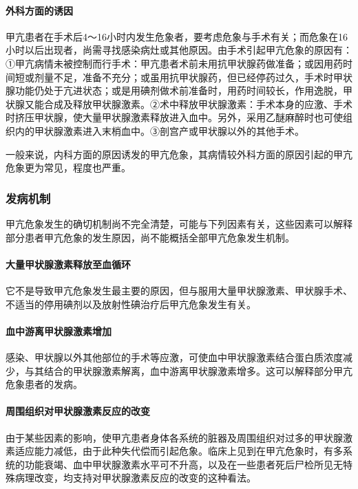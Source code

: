 \paragraph{外科方面的诱因}

甲亢患者在手术后4～16小时内发生危象者，要考虑危象与手术有关；而危象在16小时以后出现者，尚需寻找感染病灶或其他原因。由手术引起甲亢危象的原因有：①甲亢病情未被控制而行手术：甲亢患者术前未用抗甲状腺药做准备；或因用药时间短或剂量不足，准备不充分；或虽用抗甲状腺药，但已经停药过久，手术时甲状腺功能仍处于亢进状态；或是用碘剂做术前准备时，用药时间较长，作用逸脱，甲状腺又能合成及释放甲状腺激素。②术中释放甲状腺激素：手术本身的应激、手术时挤压甲状腺，使大量甲状腺激素释放进入血中。另外，采用乙醚麻醉时也可使组织内的甲状腺激素进入末梢血中。③剖宫产或甲状腺以外的其他手术。

一般来说，内科方面的原因诱发的甲亢危象，其病情较外科方面的原因引起的甲亢危象更为常见，程度也严重。

\subsubsection{发病机制}

甲亢危象发生的确切机制尚不完全清楚，可能与下列因素有关，这些因素可以解释部分患者甲亢危象的发生原因，尚不能概括全部甲亢危象发生机制。

\paragraph{大量甲状腺激素释放至血循环}

它不是导致甲亢危象发生最主要的原因，但与服用大量甲状腺激素、甲状腺手术、不适当的停用碘剂以及放射性碘治疗后甲亢危象发生有关。

\paragraph{血中游离甲状腺激素增加}

感染、甲状腺以外其他部位的手术等应激，可使血中甲状腺激素结合蛋白质浓度减少，与其结合的甲状腺激素解离，血中游离甲状腺激素增多。这可以解释部分甲亢危象患者的发病。

\paragraph{周围组织对甲状腺激素反应的改变}

由于某些因素的影响，使甲亢患者身体各系统的脏器及周围组织对过多的甲状腺激素适应能力减低，由于此种失代偿而引起危象。临床上见到在甲亢危象时，有多系统的功能衰竭、血中甲状腺激素水平可不升高，以及在一些患者死后尸检所见无特殊病理改变，均支持对甲状腺激素反应的改变的这种看法。

